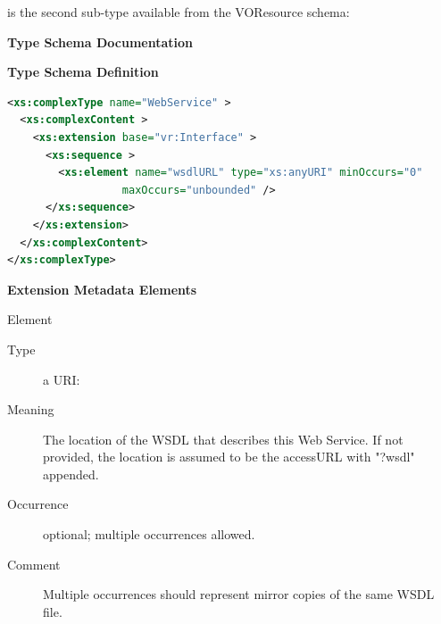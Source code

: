 \documentclass[11pt,a4paper]{ivoa}
\begin{document}
 is the second 
sub-type available from the VOResource schema:

\begin{generated}
\begingroup
      	\renewcommand*\descriptionlabel[1]{%
      	\hbox to 5.5em{\emph{#1}\hfil}}\vspace{2ex}\noindent\textbf{ Type Schema Documentation}



\vspace{1ex}\noindent\textbf{ Type Schema Definition}

\begin{lstlisting}[language=XML,basicstyle=\footnotesize]
<xs:complexType name="WebService" >
  <xs:complexContent >
    <xs:extension base="vr:Interface" >
      <xs:sequence >
        <xs:element name="wsdlURL" type="xs:anyURI" minOccurs="0"
                  maxOccurs="unbounded" />
      </xs:sequence>
    </xs:extension>
  </xs:complexContent>
</xs:complexType>
\end{lstlisting}

\vspace{0.5ex}\noindent\textbf{ Extension Metadata Elements}

\begingroup\small\begin{bigdescription}\item[Element \xmlel{wsdlURL}]
\begin{description}
\item[Type] a URI: 
\item[Meaning] 
                        The location of the WSDL that describes this
                        Web Service.  If not provided, the location is 
                        assumed to be the accessURL with {"}?wsdl{"} appended.
                     
\item[Occurrence] optional; multiple occurrences allowed.
\item[Comment] 
                        Multiple occurrences should represent mirror copies of 
                        the same WSDL file.  
                     

\end{description}


\end{bigdescription}\endgroup

\endgroup
\end{generated}
\end{document}
